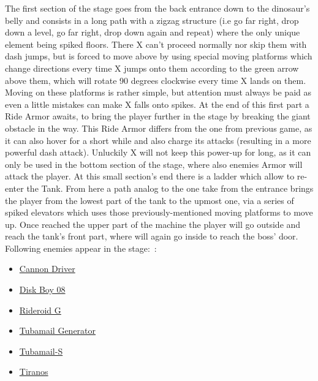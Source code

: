 The first section of the stage goes from the back entrance down to the dinosaur's belly and consists in a long path with a zigzag structure (i.e go far right, drop down a level, go far right, drop down again and repeat) where the only unique element being spiked floors. There X can't proceed normally nor skip them with dash jumps, but is forced to move above by using special moving platforms which change directions every time X jumps onto them according to the green arrow above them, which will rotate 90 degrees clockwise every time X lands on them. Moving on these platforms is rather simple, but attention must always be paid as even a little mistakes can make X falls onto spikes. At the end of this first part a Ride Armor awaits, to bring the player further in the stage by breaking the giant obstacle in the way. This Ride Armor differs from the one from previous game, as it can also hover for a short while and also charge its attacks (resulting in a more powerful dash attack). Unluckily X will not keep this power-up for long, as it can only be used in the bottom section of the stage, where also enemies Armor will attack the player. At this small section's end there is a ladder which allow to re-enter the Tank. From here a path analog to the one take from the entrance brings the player from the lowest part of the tank to the upmost one, via a series of spiked elevators which uses those previously-mentioned moving platforms to move up. Once reached the upper part of the machine the player will go outside and reach the tank's front part, where will again go inside  to reach the boss' door.
Following enemies appear in the stage:~\cite{wiki:Dinosaur_tank}:
\begin{itemize}
	\item \hyperlink {enem:Cannon_Driver}{Cannon Driver}
	\item \hyperlink {enem:Disk_Boy_08}{Disk Boy 08}
	\item \hyperlink {enem:Rideroid G}{Rideroid G}
	\item \hyperlink {enem:Tubamail_Generator}{Tubamail Generator}
	\item \hyperlink {enem:Tubamail-S}{Tubamail-S}
	\item \hyperlink {enem:Tiranos}{Tiranos}
\end{itemize}


